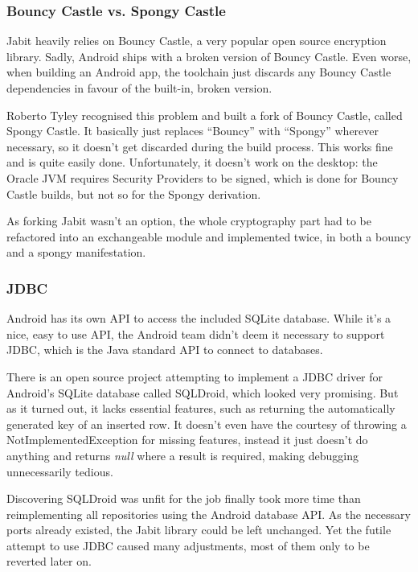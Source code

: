 \documentclass{bfh}
\begin{document}
  \subsubsection{Bouncy Castle vs. Spongy Castle}
  \label{subsec:bcvssc}
  Jabit heavily relies on Bouncy Castle, a very popular open source encryption library.\cite{bouncy} Sadly, Android ships with a broken version of Bouncy Castle. Even worse, when building an Android app, the toolchain just discards any Bouncy Castle dependencies in favour of the built-in, broken version.

  Roberto Tyley recognised this problem and built a fork of Bouncy Castle, called Spongy Castle.\cite{spongy} It basically just replaces “Bouncy” with “Spongy” wherever necessary, so it doesn’t get discarded during the build process. This works fine and is quite easily done. Unfortunately, it doesn’t work on the desktop: the Oracle JVM requires Security Providers to be signed, which is done for Bouncy Castle builds, but not so for the Spongy derivation.

  As forking Jabit wasn’t an option, the whole cryptography part had to be refactored into an exchangeable module and implemented twice, in both a bouncy and a spongy manifestation.

  \subsubsection{JDBC}
  \label{subsec:jdbc}
  Android has its own \ac{API} to access the included SQLite database. While it’s a nice, easy to use \ac{API}, the Android team didn’t deem it necessary to support \acs{JDBC}, which is the Java standard API to connect to databases.

  There is an open source project attempting to implement a \ac{JDBC} driver for Android’s SQLite database called SQLDroid, which looked very promising. But as it turned out, it lacks essential features, such as returning the automatically generated key of an inserted row. It doesn't even have the courtesy of throwing a NotImplementedException for missing features, instead it just doesn't do anything and returns \textit{null} where a result is required, making debugging unnecessarily tedious.\cite{github:sqldroid}

  Discovering SQLDroid was unfit for the job finally took more time than reimplementing all repositories using the Android database API. As the necessary ports already existed, the Jabit library could be left unchanged. Yet the futile attempt to use JDBC caused many adjustments, most of them only to be reverted later on.
\end{document}
